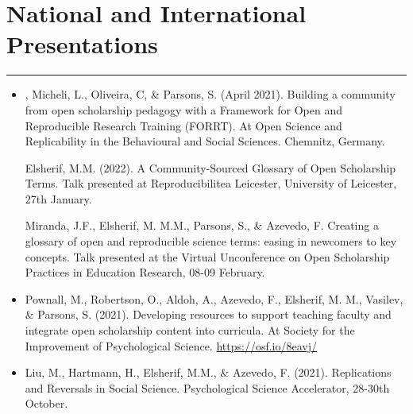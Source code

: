 \documentclass[letterpaper]{article}
\begin{document}
\section*{\color{Brown} National and International Presentations}
\vspace{-.5em}
\hrule
\vspace{1em}
\begin{itemize}

\item[] {, Micheli, L., Oliveira, C, \& Parsons, S. (April 2021). Building a community from open scholarship pedagogy with a Framework for Open and Reproducible Research Training (FORRT). At Open Science and Replicability in the Behavioural and Social Sciences. Chemnitz, Germany.}

Elsherif, M.M. (2022). A Community-Sourced Glossary of Open Scholarship Terms. Talk presented at Reproducibilitea Leicester, University of Leicester, 27th January.

Miranda, J.F., Elsherif, M. M.M., Parsons, S., \& Azevedo, F. Creating a glossary of open and reproducible science terms: easing in newcomers to key concepts. Talk presented at the Virtual Unconference on Open Scholarship Practices in Education Research, 08-09 February.

\item[] {\noindent Pownall, M., Robertson, O., Aldoh, A., Azevedo, F., Elsherif, M. M.,  Vasilev, \& Parsons, S. (2021). Developing resources to support teaching faculty and integrate open scholarship content into curricula. At Society for the Improvement of Psychological Science.} \href{https://osf.io/8eavj/}{\color{BlueViolet}https://osf.io/8eavj/}

\item[] {\noindent Liu, M., Hartmann, H., Elsherif, M.M.,  & Azevedo, F. (2021). Replications and Reversals in Social Science.  Psychological Science Accelerator, 28-30th October.}

\end{itemize}
\end{document}
